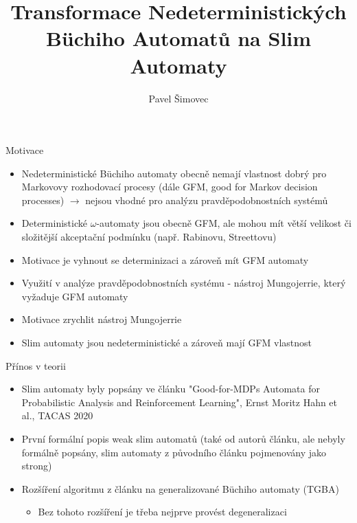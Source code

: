\documentclass[
]{beamer}
\title[Slim Automata]{Transformace Nedeterministických Büchiho Automatů na Slim Automaty}
\author[P. Šimovec]{Pavel Šimovec\texorpdfstring{\\}{, }}
\institute[FI MU]{Fakulta Informatiky, Masarykova Univerzita}
\date{\formatdate{30}{6}{2021}}
\begin{document}
	
	\begin{frame}
		\maketitle
	\end{frame}
	

	\begin{frame}{Motivace}
		\begin{itemize}
			\pause
			\item Nedeterministické Büchiho automaty obecně nemají vlastnost \alert{dobrý pro Markovovy rozhodovací procesy} (dále \alert{GFM}, good for Markov decision processes) $\rightarrow$ nejsou vhodné pro analýzu pravděpodobnostních systémů
			\pause
			\item Deterministické $\omega$-automaty jsou obecně GFM, ale mohou mít větší velikost či složitější akceptační podmínku (např. Rabinovu, Streettovu)
			\pause
			\item Motivace je vyhnout se determinizaci a zároveň mít GFM automaty
			\pause
			\item Využití v analýze pravděpodobnostních systému - nástroj \alert{Mungojerrie}, který vyžaduje GFM automaty
			\pause
			\item Motivace zrychlit nástroj Mungojerrie
			\pause
			\item Slim automaty jsou nedeterministické a zároveň mají GFM vlastnost
		\end{itemize}
	\end{frame}

	\begin{frame}{Přínos v teorii}
		\begin{itemize}
			\pause
			\item Slim automaty byly popsány ve článku "Good-for-MDPs Automata for Probabilistic Analysis and Reinforcement
			Learning", Ernst Moritz Hahn et al., TACAS 2020
			\pause
			\item První formální popis \alert{weak slim automatů} (také od autorů článku, ale nebyly formálně popsány, slim automaty z původního článku pojmenovány jako \alert{strong})
			\pause
			\item Rozšíření algoritmu z článku na \alert{generalizované} Büchiho automaty (TGBA)
			\pause
			\begin{itemize}
			\item Bez tohoto rozšíření je třeba nejprve provést degeneralizaci
			\end{itemize}
			
		\end{itemize}
	
	
	\end{frame}
	
\end{document}
